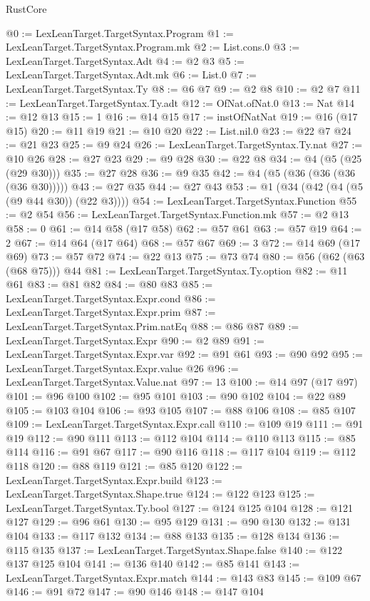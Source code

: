 \begin{lexlean}{RustCore}
\begin{coremodule}
@0 := LexLeanTarget.TargetSyntax.Program
@1 := LexLeanTarget.TargetSyntax.Program.mk
@2 := List.cons.{0}
@3 := LexLeanTarget.TargetSyntax.Adt
@4 := @2 @3
@5 := LexLeanTarget.TargetSyntax.Adt.mk
@6 := List.{0}
@7 := LexLeanTarget.TargetSyntax.Ty
@8 := @6 @7
@9 := @2 @8
@10 := @2 @7
@11 := LexLeanTarget.TargetSyntax.Ty.adt
@12 := OfNat.ofNat.{0}
@13 := Nat
@14 := @12 @13
@15 := 1
@16 := @14 @15
@17 := instOfNatNat
@19 := @16 (@17 @15)
@20 := @11 @19
@21 := @10 @20
@22 := List.nil.{0}
@23 := @22 @7
@24 := @21 @23
@25 := @9 @24
@26 := LexLeanTarget.TargetSyntax.Ty.nat
@27 := @10 @26
@28 := @27 @23
@29 := @9 @28
@30 := @22 @8
@34 := @4 (@5 (@25 (@29 @30)))
@35 := @27 @28
@36 := @9 @35
@42 := @4 (@5 (@36 (@36 (@36 (@36 @30)))))
@43 := @27 @35
@44 := @27 @43
@53 := @1 (@34 (@42 (@4 (@5 (@9 @44 @30)) (@22 @3))))
@54 := LexLeanTarget.TargetSyntax.Function
@55 := @2 @54
@56 := LexLeanTarget.TargetSyntax.Function.mk
@57 := @2 @13
@58 := 0
@61 := @14 @58 (@17 @58)
@62 := @57 @61
@63 := @57 @19
@64 := 2
@67 := @14 @64 (@17 @64)
@68 := @57 @67
@69 := 3
@72 := @14 @69 (@17 @69)
@73 := @57 @72
@74 := @22 @13
@75 := @73 @74
@80 := @56 (@62 (@63 (@68 @75))) @44
@81 := LexLeanTarget.TargetSyntax.Ty.option
@82 := @11 @61
@83 := @81 @82
@84 := @80 @83
@85 := LexLeanTarget.TargetSyntax.Expr.cond
@86 := LexLeanTarget.TargetSyntax.Expr.prim
@87 := LexLeanTarget.TargetSyntax.Prim.natEq
@88 := @86 @87
@89 := LexLeanTarget.TargetSyntax.Expr
@90 := @2 @89
@91 := LexLeanTarget.TargetSyntax.Expr.var
@92 := @91 @61
@93 := @90 @92
@95 := LexLeanTarget.TargetSyntax.Expr.value @26
@96 := LexLeanTarget.TargetSyntax.Value.nat
@97 := 13
@100 := @14 @97 (@17 @97)
@101 := @96 @100
@102 := @95 @101
@103 := @90 @102
@104 := @22 @89
@105 := @103 @104
@106 := @93 @105
@107 := @88 @106
@108 := @85 @107
@109 := LexLeanTarget.TargetSyntax.Expr.call
@110 := @109 @19
@111 := @91 @19
@112 := @90 @111
@113 := @112 @104
@114 := @110 @113
@115 := @85 @114
@116 := @91 @67
@117 := @90 @116
@118 := @117 @104
@119 := @112 @118
@120 := @88 @119
@121 := @85 @120
@122 := LexLeanTarget.TargetSyntax.Expr.build
@123 := LexLeanTarget.TargetSyntax.Shape.true
@124 := @122 @123
@125 := LexLeanTarget.TargetSyntax.Ty.bool
@127 := @124 @125 @104
@128 := @121 @127
@129 := @96 @61
@130 := @95 @129
@131 := @90 @130
@132 := @131 @104
@133 := @117 @132
@134 := @88 @133
@135 := @128 @134
@136 := @115 @135
@137 := LexLeanTarget.TargetSyntax.Shape.false
@140 := @122 @137 @125 @104
@141 := @136 @140
@142 := @85 @141
@143 := LexLeanTarget.TargetSyntax.Expr.match
@144 := @143 @83
@145 := @109 @67
@146 := @91 @72
@147 := @90 @146
@148 := @147 @104

\end{coremodule}
\end{lexlean}
